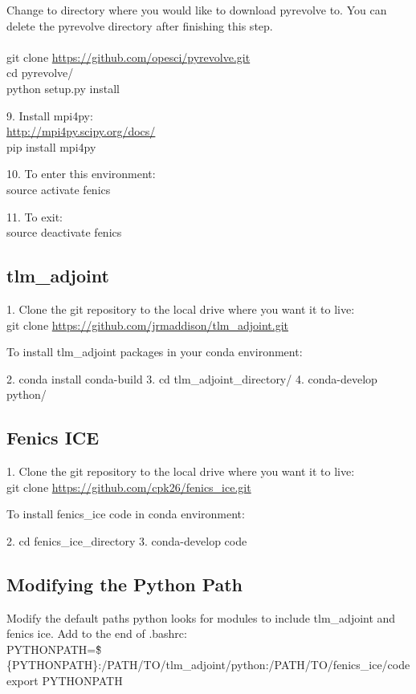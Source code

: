 \documentclass[11pt, reqno, nocenter]{article}
\begin{document}
Change to directory where you would like to download pyrevolve to. You can delete the pyrevolve directory after finishing this step. \\ \\
git clone \url{https://github.com/opesci/pyrevolve.git} \\
cd pyrevolve/ \\
python setup.py install

9. Install mpi4py: \\
\url{http://mpi4py.scipy.org/docs/} \\
pip install mpi4py

10. To enter this environment: \\
source activate fenics

11. To exit: \\
source deactivate fenics

\subsection{tlm\_adjoint}

1. Clone the git repository to the local drive where you want it to live:\\
git clone \url{https://github.com/jrmaddison/tlm_adjoint.git}

To install tlm_adjoint packages in your conda environment:

2. conda install conda-build
3. cd tlm_adjoint_directory/
4. conda-develop python/

\subsection{Fenics ICE}

1. Clone the git repository to the local drive where you want it to live: \\
git clone \url{https://github.com/cpk26/fenics_ice.git}

To install fenics_ice code in conda environment:

2. cd fenics_ice_directory
3. conda-develop code

\subsection{Modifying the Python Path}

Modify the default paths python looks for modules to include tlm\_adjoint and fenics ice. Add to the end of .bashrc: \\
PYTHONPATH=\"\$\{PYTHONPATH\}:/PATH/TO/tlm\_adjoint/python:/PATH/TO/fenics\_ice/code\" \\
export PYTHONPATH
\end{document}
